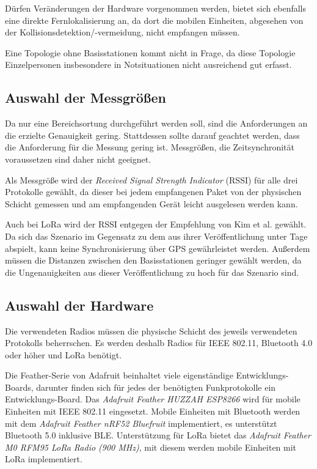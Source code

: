 Dürfen Veränderungen der Hardware vorgenommen werden, bietet sich ebenfalls eine direkte Fernlokalisierung an, da dort die mobilen Einheiten, abgesehen von der Kollisionsdetektion/-vermeidung, nicht empfangen müssen.

Eine Topologie ohne Basisstationen kommt nicht in Frage, da diese Topologie Einzelpersonen insbesondere in Notsituationen nicht ausreichend gut erfasst.




\subsection{Auswahl der Messgrößen}
Da nur eine Bereichsortung durchgeführt werden soll, sind die Anforderungen an die erzielte Genauigkeit gering.
Stattdessen sollte darauf geachtet werden, dass die Anforderung für die Messung gering ist.
Messgrößen, die Zeitsynchronität voraussetzen sind daher nicht geeignet.

Als Messgröße wird der \emph{Received Signal Strength Indicator} (RSSI) für alle drei Protokolle gewählt, da dieser bei jedem empfangenen Paket von der physischen Schicht gemessen und am empfangenden Gerät leicht ausgelesen werden kann.

Auch bei LoRa wird der RSSI entgegen der Empfehlung von Kim et al. gewählt.
Da sich das Szenario im Gegensatz zu dem aus ihrer  Veröffentlichung unter Tage abspielt, kann keine Synchronisierung über GPS gewährleistet werden. 
Außerdem müssen die Distanzen zwischen den Basisstationen geringer gewählt werden, da die Ungenauigkeiten aus dieser Veröffentlichung zu hoch für das Szenario sind.

\subsection{Auswahl der Hardware}
Die verwendeten Radios müssen die physische Schicht des jeweils verwendeten Protokolls beherrschen.
Es werden deshalb Radios für IEEE 802.11, Bluetooth 4.0 oder höher und LoRa benötigt.

Die Feather-Serie von Adafruit beinhaltet viele eigenständige Entwicklungs-Boards, darunter finden sich für jedes der benötigten Funkprotokolle ein Entwicklungs-Board.
Das \textit{Adafruit Feather HUZZAH ESP8266} wird für mobile Einheiten mit IEEE 802.11 eingesetzt.
Mobile Einheiten mit Bluetooth werden mit dem \textit{Adafruit Feather nRF52 Bluefruit} implementiert, es unterstützt Bluetooth 5.0 inklusive BLE.
Unterstützung für LoRa bietet das \textit{Adafruit Feather M0 RFM95 LoRa Radio (900 MHz)}, mit diesem werden mobile Einheiten mit LoRa implementiert.

